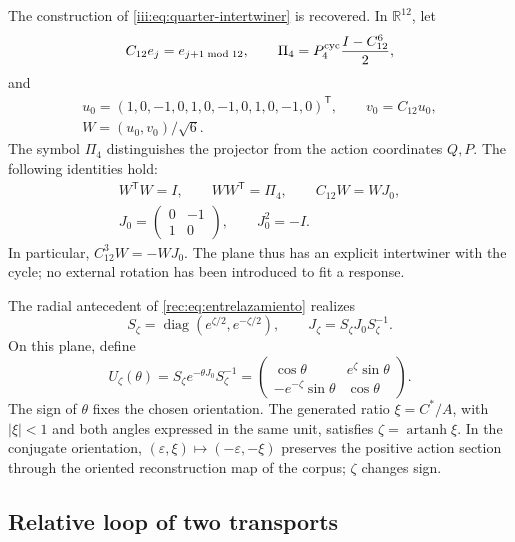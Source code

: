 The construction of \eqref{iii:eq:quarter-intertwiner} is recovered.
In \(\mathbb R^{12}\), let
\[
 C_{12}e_j=e_{j+1\bmod12},\qquad
 \Pi_4=P_4^{\rm cyc}\frac{I-C_{12}^6}{2},
\]
and
\begin{equation}
 \begin{gathered}
 u_0=(1,0,-1,0,1,0,-1,0,1,0,-1,0)^{\mathsf T},\qquad
 v_0=C_{12}u_0,\\
 W=(u_0,v_0)/\sqrt6.
 \end{gathered}
 \label{md:comp:isometria-ciclica}
\end{equation}
The symbol \(\Pi_4\) distinguishes the projector from the action
coordinates \(Q,P\). The following identities hold:
\begin{equation}
 \begin{gathered}
 W^{\mathsf T}W=I,\qquad WW^{\mathsf T}=\Pi_4,\qquad
 C_{12}W=WJ_0,\\
 J_0=\begin{pmatrix}0&-1\\1&0\end{pmatrix},\qquad J_0^2=-I.
 \end{gathered}
 \label{md:comp:entrelazador-ciclico}
\end{equation}
In particular, \(C_{12}^3W=-WJ_0\). The plane thus has an explicit
intertwiner with the cycle; no external rotation has been introduced to
fit a response.

The radial antecedent of \eqref{rec:eq:entrelazamiento} realizes
\[
 S_\zeta=\operatorname{diag}(e^{\zeta/2},e^{-\zeta/2}),
 \qquad J_\zeta=S_\zeta J_0S_\zeta^{-1}.
\]
On this plane, define
\begin{equation}
 U_\zeta(\theta)=S_\zeta e^{-\theta J_0}S_\zeta^{-1}
 =\begin{pmatrix}
 \cos\theta&e^\zeta\sin\theta\\
 -e^{-\zeta}\sin\theta&\cos\theta
 \end{pmatrix}.
 \label{md:comp:transporte-plano}
\end{equation}
The sign of \(\theta\) fixes the chosen orientation. The generated
ratio \(\xi=C^*/A\), with \(|\xi|<1\) and both angles expressed in the
same unit, satisfies \(\zeta=\operatorname{artanh}\xi\).
In the conjugate orientation,
\((\varepsilon,\xi)\mapsto(-\varepsilon,-\xi)\) preserves the positive
action section through the oriented reconstruction map of the corpus;
\(\zeta\) changes sign.

\subsection{Relative loop of two transports}
\label{md:comp:lazo}

